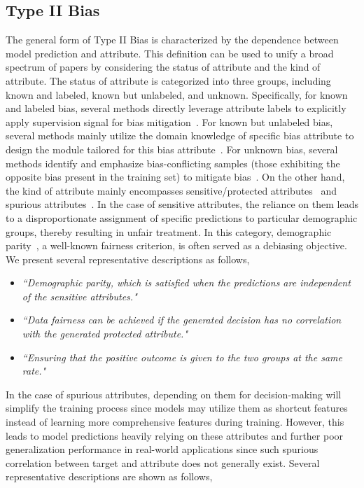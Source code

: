 \subsection{Type II Bias}
\label{subsec:Type_II_Bias}
The general form of Type II Bias is characterized by the dependence between model prediction and attribute. 
This definition can be used to unify a broad spectrum of papers by considering the status of attribute and the kind of attribute.
The status of attribute is categorized into three groups, including known and labeled, known but unlabeled, and unknown.
Specifically, for known and labeled bias, several methods directly leverage attribute labels to explicitly apply supervision signal for bias mitigation~\cite{CSAD}.
For known but unlabeled bias, several methods mainly utilize the domain knowledge of specific bias attribute to design the module tailored for this bias attribute~\cite{HEX_texture_bias1}.
For unknown bias, several methods identify and emphasize bias-conflicting samples (those exhibiting the opposite bias present in the training set) to mitigate bias~\cite{ECS}. On the other hand, the kind of attribute mainly encompasses sensitive/protected attributes~\cite{machine_bias,annotation_bias,discrimination_score} and spurious attributes~\cite{LfF_CelebA_Bias_conflicting,Group_DRO,ECS}.
In the case of sensitive attributes, the reliance on them leads to a disproportionate assignment of specific predictions to particular demographic groups, thereby resulting in unfair treatment.
In this category, demographic parity~\cite{fairness_through_awareness}, a well-known fairness criterion, is often served as a debiasing objective. 
We present several representative descriptions as follows, \eg

\begin{itemize}
    \item \emph{``Demographic parity, which is satisfied when the predictions are independent of the sensitive attributes."}~\cite{DP_FFVAE}
    \item \emph{``Data fairness can be achieved if the generated decision has no correlation with the generated protected attribute."}~\cite{fairgan}
    \item \emph{``Ensuring that the positive outcome is given to the two groups at the same rate."}~\cite{LAFTR}
\end{itemize}

\noindent
In the case of spurious attributes, depending on them for decision-making will simplify the training process since models may utilize them as shortcut features instead of learning more comprehensive features during training. However, this leads to model predictions heavily relying on these attributes and further poor generalization performance in real-world applications since such spurious correlation between target and attribute does not generally exist. 
Several representative descriptions are shown as follows, \eg

